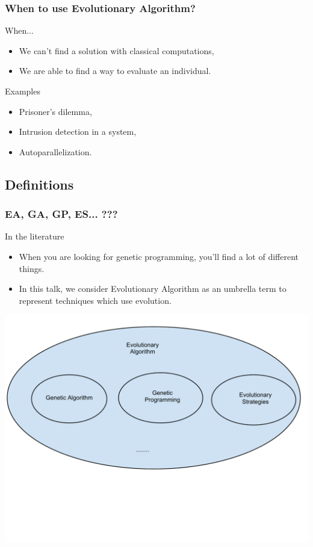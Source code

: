 \begin{frame}
  \frametitle{When to use Evolutionary Algorithm?}
  \begin{block}{When...}
    \begin{itemize}
    \item We can't find a solution with classical computations,
    \item We are able to find a way to evaluate an individual.
    \end{itemize}
  \end{block}

  \begin{block}{Examples}
    \begin{itemize}
    \item Prisoner's dilemma\cite{axelrod1991},
    \item Intrusion detection in a system\cite{crosby1995},
    \item Autoparallelization\cite{walsh1996}.
    \end{itemize}
  \end{block}
\end{frame}

\subsection{Definitions}

\begin{frame}
  \frametitle{EA, GA, GP, ES... ???}
  \begin{block}{In the literature}
    \begin{itemize}
    \item When you are looking for genetic programming, you'll find a
      lot of different things.
    \item In this talk, we consider Evolutionary Algorithm as an
      umbrella term to represent techniques which use evolution.
    \end{itemize}
\end{block}

  \begin{center}
    \includegraphics[scale=0.4]{img/ea}
  \end{center}
\end{frame}

